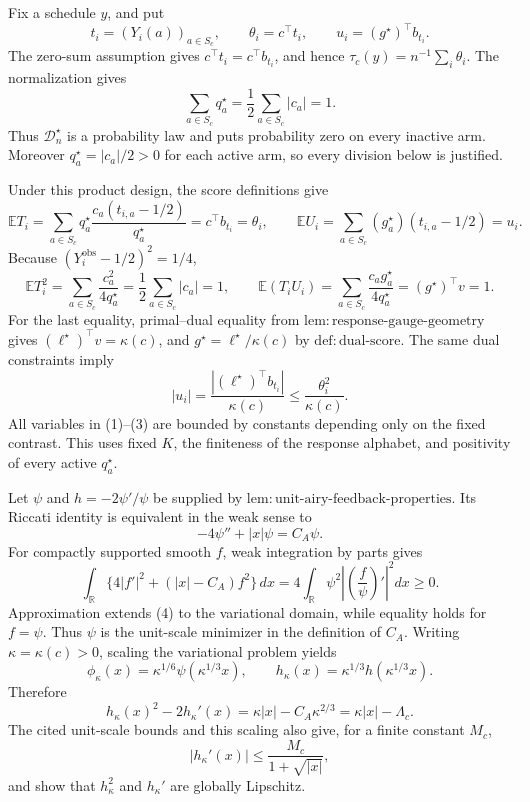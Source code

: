 Fix a schedule \(y\), and put
\[
t_i=(Y_i(a))_{a\in S_c},\qquad
\theta_i=c^\top t_i,\qquad
u_i=(g^\star)^\top b_{t_i}.
\]
The zero-sum assumption gives \(c^\top t_i=c^\top b_{t_i}\), and hence
\(\tau_c(y)=n^{-1}\sum_i\theta_i\).  The normalization gives
\[
\sum_{a\in S_c}q_a^\star=\frac12\sum_{a\in S_c}|c_a|=1.
\]
Thus \(\mathcal D_n^\star\) is a probability law and puts probability zero on every inactive arm.  Moreover \(q_a^\star=|c_a|/2>0\) for each active arm, so every division below is justified.

Under this product design, the score definitions give
\[
\mathbb ET_i
=\sum_{a\in S_c}q_a^\star
\frac{c_a(t_{i,a}-1/2)}{q_a^\star}
=c^\top b_{t_i}=\theta_i,
\qquad
\mathbb EU_i
=\sum_{a\in S_c}(g_a^\star)(t_{i,a}-1/2)=u_i.
\tag{1}
\]
Because \((Y_i^{\mathrm{obs}}-1/2)^2=1/4\),
\[
\mathbb ET_i^2
=\sum_{a\in S_c}\frac{c_a^2}{4q_a^\star}
=\frac12\sum_{a\in S_c}|c_a|=1,
\qquad
\mathbb E(T_iU_i)
=\sum_{a\in S_c}\frac{c_ag_a^\star}{4q_a^\star}
=(g^\star)^\top v=1.
\tag{2}
\]
For the last equality, primal--dual equality from
\(\mathrm{lem:response\text{-}gauge\text{-}geometry}\) gives
\((\ell^\star)^\top v=\kappa(c)\), and
\(g^\star=\ell^\star/\kappa(c)\) by
\(\mathrm{def:dual\text{-}score}\).  The same dual constraints imply
\[
|u_i|
=\frac{|(\ell^\star)^\top b_{t_i}|}{\kappa(c)}
\le\frac{\theta_i^2}{\kappa(c)}.
\tag{3}
\]
All variables in (1)--(3) are bounded by constants depending only on the fixed contrast.  This uses fixed \(K\), the finiteness of the response alphabet, and positivity of every active \(q_a^\star\).

Let \(\psi\) and \(h=-2\psi'/\psi\) be supplied by
\(\mathrm{lem:unit\text{-}airy\text{-}feedback\text{-}properties}\).
Its Riccati identity is equivalent in the weak sense to
\[
-4\psi''+|x|\psi=C_A\psi.
\]
For compactly supported smooth \(f\), weak integration by parts gives
\[
\int_{\mathbb R}\{4|f'|^2+(|x|-C_A)f^2\}\,dx
=4\int_{\mathbb R}\psi^2
\left|\left(\frac f\psi\right)'\right|^2dx\ge0.
\tag{4}
\]
Approximation extends (4) to the variational domain, while equality holds for \(f=\psi\).  Thus \(\psi\) is the unit-scale minimizer in the definition of \(C_A\).  Writing \(\kappa=\kappa(c)>0\), scaling the variational problem yields
\[
\phi_\kappa(x)=\kappa^{1/6}\psi(\kappa^{1/3}x),
\qquad
h_\kappa(x)=\kappa^{1/3}h(\kappa^{1/3}x).
\]
Therefore
\[
h_\kappa(x)^2-2h_\kappa'(x)
=\kappa|x|-C_A\kappa^{2/3}
=\kappa|x|-\Lambda_c.
\tag{5}
\]
The cited unit-scale bounds and this scaling also give, for a finite constant \(M_c\),
\[
|h_\kappa'(x)|\le\frac{M_c}{1+\sqrt{|x|}},
\tag{6}
\]
and show that \(h_\kappa^2\) and \(h_\kappa'\) are globally Lipschitz.

